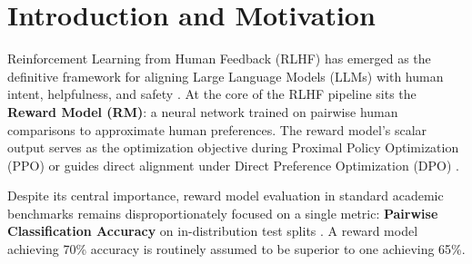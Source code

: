 \documentclass[12pt,a4paper]{article}
\begin{document}
\newpage

\section{Introduction and Motivation}

Reinforcement Learning from Human Feedback (RLHF) has emerged as the definitive framework for aligning Large Language Models (LLMs) with human intent, helpfulness, and safety \citep{christiano2017deep,stiennon2020learning,ouyang2022training}. At the core of the RLHF pipeline sits the \textbf{Reward Model (RM)}: a neural network trained on pairwise human comparisons to approximate human preferences. The reward model's scalar output serves as the optimization objective during Proximal Policy Optimization (PPO) \citep{ouyang2022training} or guides direct alignment under Direct Preference Optimization (DPO) \citep{rafailov2023direct}.

Despite its central importance, reward model evaluation in standard academic benchmarks remains disproportionately focused on a single metric: \textbf{Pairwise Classification Accuracy} on in-distribution test splits \citep{lambert2024rewardbench}. A reward model achieving 70\% accuracy is routinely assumed to be superior to one achieving 65\%.
\end{document}
